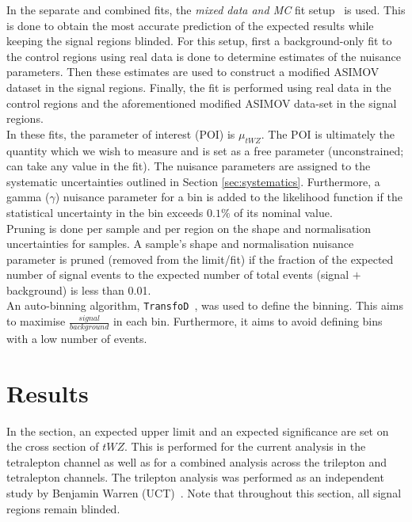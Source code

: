 In the separate and combined fits, the \textit{mixed data and MC} fit setup~\cite{MixedDataAndMC_TRF} is used. This is done to obtain the most accurate prediction of the expected results while keeping the signal regions blinded. For this setup, first a background-only fit to the control regions using real data is done to determine estimates of the nuisance parameters. Then these estimates are used to construct a modified ASIMOV dataset in the signal regions. Finally, the fit is performed using real data in the control regions and the aforementioned modified ASIMOV data-set in the signal regions.\\

In these fits, the parameter of interest (POI) is $\mu_{tWZ}$. The POI is ultimately the quantity which we wish to measure and is set as a free parameter (unconstrained; can take any value in the fit). The nuisance parameters are assigned to the systematic uncertainties outlined in Section \ref{sec:systematics}. Furthermore, a gamma ($\gamma$) nuisance parameter for a bin is added to the likelihood function if the statistical uncertainty in the bin exceeds $0.1\%$ of its nominal value.\\

Pruning is done per sample and per region on the shape and normalisation uncertainties for samples. A sample's shape and normalisation nuisance parameter is pruned (removed from the limit/fit) if the fraction of the expected number of signal events to the expected number of total events (signal $+$ background) is less than 0.01.\\

An auto-binning algorithm, \texttt{TransfoD}~\cite{transfod-autobin}, was used to define the binning. This aims to maximise $\frac{signal}{background}$ in each bin. Furthermore, it aims to avoid defining bins with a low number of events.

\section{Results}

In the section, an expected upper limit and an expected significance are set on the cross section of $tWZ$. This is performed for the current analysis in the tetralepton channel as well as for a combined analysis across the trilepton and tetralepton channels. The trilepton analysis was performed as an independent study by Benjamin Warren (UCT)~\cite{ben-thesis}. Note that throughout this section, all signal regions remain blinded.

